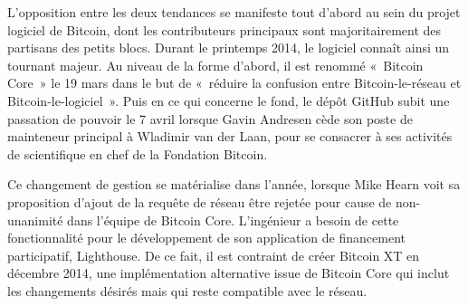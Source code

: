 L'opposition entre les deux tendances se manifeste tout d'abord au sein du projet logiciel de Bitcoin, dont les contributeurs principaux sont majoritairement des partisans des petits blocs. Durant le printemps 2014, le logiciel connaît ainsi un tournant majeur. Au niveau de la forme d'abord, il est renommé «~Bitcoin Core~» le 19 mars dans le but de «~réduire la confusion entre Bitcoin-le-réseau et Bitcoin-le-logiciel~». Puis en ce qui concerne le fond, le dépôt GitHub subit une passation de pouvoir le 7 avril lorsque Gavin Andresen cède son poste de mainteneur principal à Wladimir van der Laan, pour se consacrer à ses activités de scientifique en chef de la Fondation Bitcoin.

Ce changement de gestion se matérialise dans l'année, lorsque Mike Hearn voit sa proposition d'ajout de la requête de réseau  être rejetée pour cause de non-unanimité dans l'équipe de Bitcoin Core. L'ingénieur a besoin de cette fonctionnalité pour le développement de son application de financement participatif, Lighthouse. De ce fait, il est contraint de créer Bitcoin XT en décembre 2014, une implémentation alternative issue de Bitcoin Core qui inclut les changements désirés mais qui reste compatible avec le réseau.

